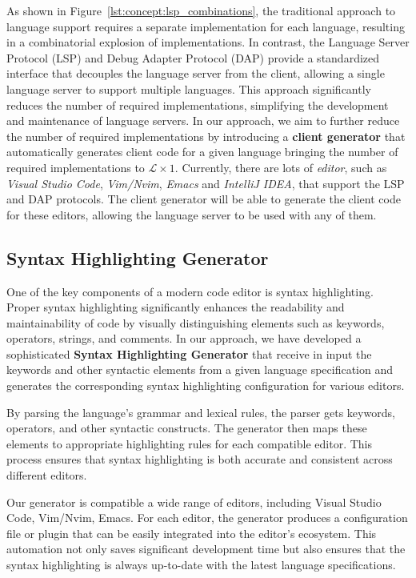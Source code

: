 As shown in Figure~\ref{lst:concept:lsp_combinations}, the traditional approach to language support requires a separate implementation for each language, resulting in a combinatorial explosion of implementations. In contrast, the Language Server Protocol (LSP) and Debug Adapter Protocol (DAP) provide a standardized interface that decouples the language server from the client, allowing a single language server to support multiple languages. This approach significantly reduces the number of required implementations, simplifying the development and maintenance of language servers.
In our approach, we aim to further reduce the number of required implementations by introducing a \textbf{client generator} that automatically generates client code for a given language bringing the number of required implementations to $\mathcal{L} \times 1$.
Currently, there are lots of \textit{editor}, such as \textit{Visual Studio Code}, \textit{Vim/Nvim}, \textit{Emacs} and \textit{IntelliJ IDEA}, that support the LSP and DAP protocols. The client generator will be able to generate the client code for these editors, allowing the language server to be used with any of them.

\subsection{Syntax Highlighting Generator}\label{subsec:concept:SyntaxHighlightingGenerator}

One of the key components of a modern code editor is syntax highlighting. Proper syntax highlighting significantly enhances the readability and maintainability of code by visually distinguishing elements such as keywords, operators, strings, and comments. In our approach, we have developed a sophisticated \textbf{Syntax Highlighting Generator} that receive in input the keywords and other syntactic elements from a given language specification and generates the corresponding syntax highlighting configuration for various editors.

By parsing the language's grammar and lexical rules, the parser gets keywords, operators, and other syntactic constructs. The generator then maps these elements to appropriate highlighting rules for each compatible editor. This process ensures that syntax highlighting is both accurate and consistent across different editors.

Our generator is compatible a wide range of editors, including Visual Studio Code, Vim/Nvim, Emacs. For each editor, the generator produces a configuration file or plugin that can be easily integrated into the editor's ecosystem. This automation not only saves significant development time but also ensures that the syntax highlighting is always up-to-date with the latest language specifications.

